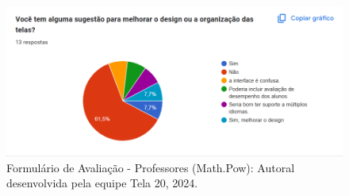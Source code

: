 \documentclass[12pt, openany, oneside, a4paper, english, brazil]{abntex2}   %
\begin{document}
\begin{figure}
    \centering
    \includegraphics[width=0.9\linewidth]{figuras/Formulário Gráficos/Professores/16 Voce tem alguma sugestao para melhorar o design ou organizacao das telas.png}
    \caption{Formulário de Avaliação - Professores (Math.Pow):  Autoral desenvolvida pela equipe Tela 20, 2024.}
    \label{gráfico gerado pelo formulário}
\end{figure}
\end{document}
